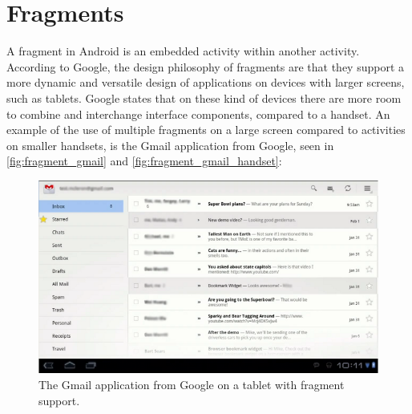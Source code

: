 \section{Fragments}
A fragment in Android is an embedded activity within another activity.
According to Google, the design philosophy of fragments\cite{web:android:fragments} are that they support a more dynamic and versatile design of applications on devices with larger screens, such as tablets.
Google states that on these kind of devices there are more room to combine and interchange interface components, compared to a handset\cite{web:android:fragments}. 
An example of the use of multiple fragments on a large screen compared to activities on smaller handsets, is the Gmail application from Google, seen in \autoref{fig:fragment_gmail} and \autoref{fig:fragment_gmail_handset}:


\begin{figure}[H]
	\centering
		\includegraphics[width=\textwidth]{Images/Implementation/fragment_gmail.png}
			\caption{The Gmail application from Google on a tablet with fragment support.}
	\label{fig:fragment_gmail}
\end{figure}

